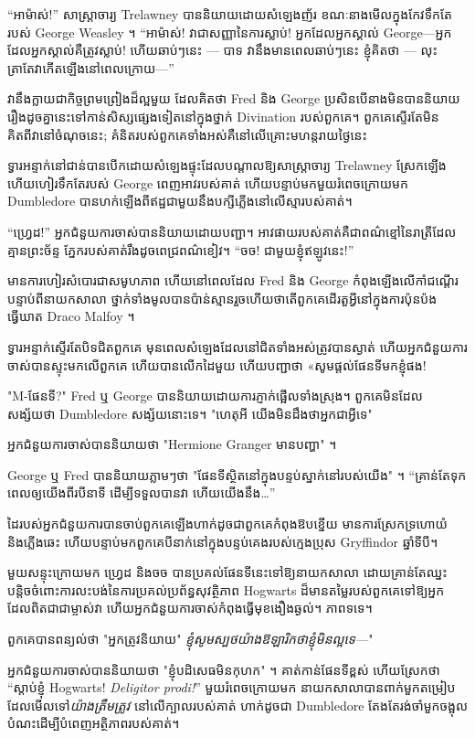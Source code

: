 {{{“អាម៉ាស់!” សាស្ត្រាចារ្យ Trelawney បាននិយាយដោយសំឡេងញ័រ ខណៈនាងមើលក្នុងកែវទឹកតែរបស់ George Weasley ។ “អាម៉ាស់! វាជាសញ្ញានៃការស្លាប់! អ្នក​ដែល​អ្នក​ស្គាល់ George—អ្នក​ដែល​អ្នក​ស្គាល់​គឺ​ត្រូវ​ស្លាប់! ហើយឆាប់ៗនេះ — បាទ វានឹងមានពេលឆាប់ៗនេះ ខ្ញុំគិតថា — លុះត្រាតែវាកើតឡើងនៅពេលក្រោយ—”

វានឹងក្លាយជាកិច្ចព្រមព្រៀងដ៏ល្អមួយ ដែលគិតថា Fred និង George ប្រសិនបើនាងមិនបាននិយាយរឿងដូចគ្នានេះទៅកាន់សិស្សផ្សេងទៀតនៅក្នុងថ្នាក់ Divination របស់ពួកគេ។ ពួកគេស្ទើរតែមិនគិតពីវានៅចំណុចនេះ; គំនិតរបស់ពួកគេទាំងអស់គឺនៅលើគ្រោះមហន្តរាយថ្ងៃនេះ

ទ្វារអន្ទាក់នៅជាន់បានបើកដោយសំឡេងផ្ទុះដែលបណ្តាលឱ្យសាស្ត្រាចារ្យ Trelawney ស្រែកឡើង ហើយហៀរទឹកតែរបស់ George ពេញអាវរបស់គាត់ ហើយបន្ទាប់មកមួយរំពេចក្រោយមក Dumbledore បានហក់ឡើងពីឥដ្ឋជាមួយនឹងបក្សីភ្លើងនៅលើស្មារបស់គាត់។

“ហ្វ្រេដ!” អ្នកជំនួយការចាស់បាននិយាយដោយបញ្ជា។ អាវផាយរបស់គាត់គឺជាពណ៌ខ្មៅនៃរាត្រីដែលគ្មានព្រះច័ន្ទ ភ្នែករបស់គាត់រឹងដូចពេជ្រពណ៌ខៀវ។ “ចច! ជាមួយខ្ញុំឥឡូវនេះ!”

មានការហៀរសំបោរជាសមូហភាព ហើយនៅពេលដែល Fred និង George កំពុងឡើងលើកាំជណ្ដើរបន្ទាប់ពីនាយកសាលា ថ្នាក់ទាំងមូលបានប៉ាន់ស្មានរួចហើយថាតើពួកគេដើរតួអ្វីនៅក្នុងការប៉ុនប៉ងធ្វើឃាត Draco Malfoy ។

ទ្វារ​អន្ទាក់​ស្ទើរតែ​បិទ​ជិត​ពួកគេ មុនពេល​សំឡេង​ដែល​នៅ​ជិត​ទាំងអស់​ត្រូវ​បាន​ស្ងាត់ ហើយ​អ្នក​ជំនួយការ​ចាស់​បាន​ស្ទុះ​មក​លើ​ពួកគេ ហើយ​បាន​លើក​ដៃ​មួយ ហើយ​បញ្ជា​ថា «​សូម​ផ្តល់​ផែនទី​មក​ខ្ញុំ​ផង​!

"M-ផែនទី?" Fred ឬ George បាននិយាយដោយការភ្ញាក់ផ្អើលទាំងស្រុង។ ពួកគេមិនដែលសង្ស័យថា Dumbledore សង្ស័យនោះទេ។ "ហេតុអី យើងមិនដឹងថាអ្នកជាអ្វីទេ"

អ្នកជំនួយការចាស់បាននិយាយថា "Hermione Granger មានបញ្ហា" ។

George ឬ Fred បាននិយាយភ្លាមៗថា "ផែនទីស្ថិតនៅក្នុងបន្ទប់ស្នាក់នៅរបស់យើង" ។ “គ្រាន់តែទុកពេលឲ្យយើងពីរបីនាទី ដើម្បីទទួលបានវា ហើយយើងនឹង…”

ដៃ​របស់​អ្នក​ជំនួយការ​បាន​ចាប់​ពួកគេ​ឡើង​ហាក់​ដូច​ជា​ពួកគេ​កំពុង​ឱប​ខ្នើយ មាន​ការ​ស្រែក​ទ្រហោយំ និង​ភ្លើង​ឆេះ ហើយ​បន្ទាប់​មក​ពួកគេ​បី​នាក់​នៅ​ក្នុង​បន្ទប់​គេង​របស់​ក្មេងប្រុស Gryffindor ឆ្នាំ​ទី​បី។

មួយសន្ទុះក្រោយមក ហ្វ្រេដ និងចច បានប្រគល់ផែនទីនេះទៅឱ្យនាយកសាលា ដោយគ្រាន់តែឈ្នះបន្តិចចំពោះការលះបង់នៃការប្រគល់ប្រព័ន្ធសុវត្ថិភាព Hogwarts ដ៏មានតម្លៃរបស់ពួកគេទៅឱ្យអ្នកដែលពិតជាជាម្ចាស់វា ហើយអ្នកជំនួយការចាស់កំពុងធ្វើមុខងឿងឆ្ងល់។ ភាពទទេ។

ពួកគេបានពន្យល់ថា "អ្នកត្រូវនិយាយ" \emph{ខ្ញុំសូមស្បថយ៉ាងឱឡារិកថាខ្ញុំមិនល្អទេ—}"

អ្នកជំនួយការចាស់បាននិយាយថា "ខ្ញុំបដិសេធមិនកុហក" ។ គាត់កាន់ផែនទីខ្ពស់ ហើយស្រែកថា “ស្តាប់ខ្ញុំ Hogwarts! \emph{Deligitor prodi!}” មួយរំពេចក្រោយមក នាយកសាលាបានពាក់មួកតម្រៀប ដែលមើលទៅ\emph{យ៉ាងត្រឹមត្រូវ} នៅលើក្បាលរបស់គាត់ ហាក់ដូចជា Dumbledore តែងតែរង់ចាំមួកចង្អុលបំណះដើម្បីបំពេញអត្ថិភាពរបស់គាត់។

}}}
